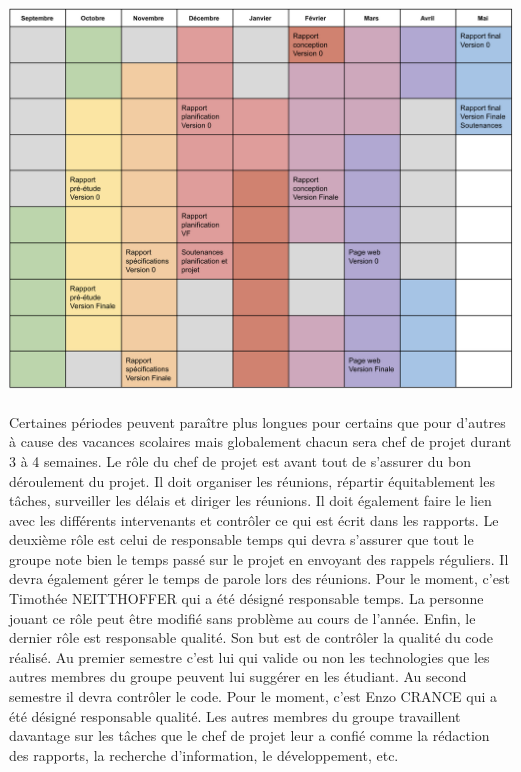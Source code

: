 \paragraph{}
\begin{mdframed}[innerbottommargin=10]
\begin{center}
\includegraphics[width=\linewidth]{planning.png}
\end{center}
\end{mdframed}
    
\paragraph{}
Certaines périodes peuvent paraître plus longues pour certains que pour d’autres à cause des vacances
scolaires mais globalement chacun sera chef de projet durant 3 à 4 semaines. Le rôle du chef de projet est
avant tout de s’assurer du bon déroulement du projet. Il doit organiser les réunions, répartir équitablement
les tâches, surveiller les délais et diriger les réunions. Il doit également faire le lien avec les
différents intervenants et contrôler ce qui est écrit dans les rapports. Le deuxième rôle est celui de
responsable temps qui devra s’assurer que tout le groupe note bien le temps passé sur le projet en envoyant
des rappels réguliers. Il devra également gérer le temps de parole lors des réunions. Pour le moment,
c’est Timothée NEITTHOFFER qui a été désigné responsable temps. La personne jouant ce rôle peut être
modifié sans problème au cours de l’année. Enfin, le dernier rôle est responsable qualité. Son but est de
contrôler la qualité du code réalisé. Au premier semestre c’est lui qui valide ou non les technologies que les
autres membres du groupe peuvent lui suggérer en les étudiant. Au second semestre il devra contrôler le code.
Pour le moment, c’est Enzo CRANCE qui a été désigné responsable qualité. Les autres membres du groupe travaillent
davantage sur les tâches que le chef de projet leur a confié comme la rédaction des rapports, la
recherche d’information, le développement, etc.

